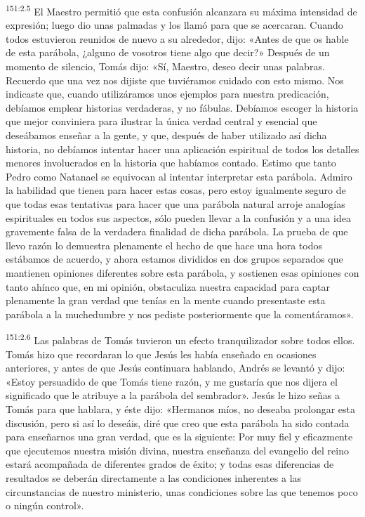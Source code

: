 \par
\textsuperscript{151:2.5} El Maestro permitió que esta confusión alcanzara su máxima intensidad de expresión; luego dio unas palmadas y los llamó para que se acercaran. Cuando todos estuvieron reunidos de nuevo a su alrededor, dijo: «Antes de que os hable de esta parábola, ¿alguno de vosotros tiene algo que decir?» Después de un momento de silencio, Tomás dijo: «Sí, Maestro, deseo decir unas palabras. Recuerdo que una vez nos dijiste que tuviéramos cuidado con esto mismo. Nos indicaste que, cuando utilizáramos unos ejemplos para nuestra predicación, debíamos emplear historias verdaderas, y no fábulas. Debíamos escoger la historia que mejor conviniera para ilustrar la única verdad central y esencial que deseábamos enseñar a la gente, y que, después de haber utilizado así dicha historia, no debíamos intentar hacer una aplicación espiritual de todos los detalles menores involucrados en la historia que habíamos contado. Estimo que tanto Pedro como Natanael se equivocan al intentar interpretar esta parábola. Admiro la habilidad que tienen para hacer estas cosas, pero estoy igualmente seguro de que todas esas tentativas para hacer que una parábola natural arroje analogías espirituales en todos sus aspectos, sólo pueden llevar a la confusión y a una idea gravemente falsa de la verdadera finalidad de dicha parábola. La prueba de que llevo razón lo demuestra plenamente el hecho de que hace una hora todos estábamos de acuerdo, y ahora estamos divididos en dos grupos separados que mantienen opiniones diferentes sobre esta parábola, y sostienen esas opiniones con tanto ahínco que, en mi opinión, obstaculiza nuestra capacidad para captar plenamente la gran verdad que tenías en la mente cuando presentaste esta parábola a la muchedumbre y nos pediste posteriormente que la comentáramos».

\par
\textsuperscript{151:2.6} Las palabras de Tomás tuvieron un efecto tranquilizador sobre todos ellos. Tomás hizo que recordaran lo que Jesús les había enseñado en ocasiones anteriores, y antes de que Jesús continuara hablando, Andrés se levantó y dijo: «Estoy persuadido de que Tomás tiene razón, y me gustaría que nos dijera el significado que le atribuye a la parábola del sembrador». Jesús le hizo señas a Tomás para que hablara, y éste dijo: «Hermanos míos, no deseaba prolongar esta discusión, pero si así lo deseáis, diré que creo que esta parábola ha sido contada para enseñarnos una gran verdad, que es la siguiente: Por muy fiel y eficazmente que ejecutemos nuestra misión divina, nuestra enseñanza del evangelio del reino estará acompañada de diferentes grados de éxito; y todas esas diferencias de resultados se deberán directamente a las condiciones inherentes a las circunstancias de nuestro ministerio, unas condiciones sobre las que tenemos poco o ningún control».

